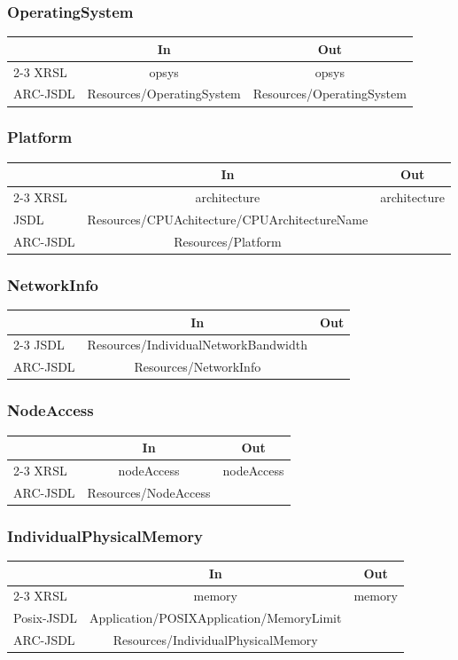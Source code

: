 \documentclass{article}
\newenvironment{inouttabular}%
{\begin{center}\begin{tabular}{l>{\ttfamily\footnotesize}c>{\ttfamily\footnotesize}c}%
\toprule
& \textnormal{\normalsize{In}} & \textnormal{\normalsize{Out}}\\ \cmidrule{2-3}}
{\bottomrule\end{tabular}\end{center}}
\begin{document}
\subsubsection{OperatingSystem}
\begin{inouttabular}
XRSL & opsys & opsys\\
ARC-JSDL & Resources/OperatingSystem & Resources/OperatingSystem\\
\end{inouttabular}

\subsubsection{Platform}
\begin{inouttabular}
XRSL & architecture & architecture\\
JSDL & Resources/CPUAchitecture/CPUArchitectureName & ~\\
ARC-JSDL & Resources/Platform &~\\
\end{inouttabular}

\subsubsection{NetworkInfo}
\begin{inouttabular}
JSDL & Resources/IndividualNetworkBandwidth &\\
ARC-JSDL & Resources/NetworkInfo &\\
\end{inouttabular}

\subsubsection{NodeAccess}
\begin{inouttabular}
XRSL & nodeAccess & nodeAccess\\
ARC-JSDL & Resources/NodeAccess & ~\\
\end{inouttabular}

\subsubsection{IndividualPhysicalMemory}
\begin{inouttabular}
XRSL & memory & memory\\
Posix-JSDL & Application/POSIXApplication/MemoryLimit &\\
ARC-JSDL & Resources/IndividualPhysicalMemory &\\
\end{inouttabular}
\end{document}
